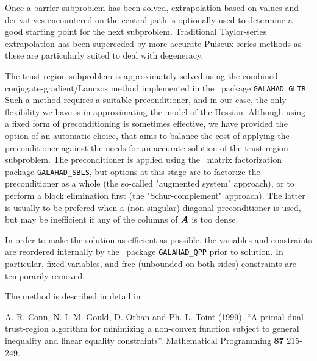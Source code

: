 \documentclass{galahad}
\begin{document}
Once a barrier subproblem has been solved, extrapolation 
based on values and derivatives encountered on the central path 
is optionally used to determine a good starting point for the next subproblem.
Traditional Taylor-series extrapolation has been superceded by more accurate
Puiseux-series methods as these are particularly suited to deal with 
degeneracy.

The trust-region subproblem is approximately solved using the 
combined conjugate-gradient/Lanczos method implemented in the 
\galahad\ package {\tt GALAHAD\_GLTR}. 
Such a method requires a suitable preconditioner,
and in our case, the only flexibility we have is in approximating the
model of the Hessian. Although using a fixed form of preconditioning is
sometimes effective, we have provided the option of an automatic choice,
that aims to balance the cost of applying the preconditioner against
the needs for an accurate solution of the trust-region subproblem. 
The preconditioner is applied using the \galahad\ matrix factorization package 
{\tt GALAHAD\_SBLS}, but options at this stage are
to factorize the preconditioner as a whole (the so-called "augmented system"
approach), or to perform a block elimination first (the "Schur-complement"
approach). The latter is usually to be prefered when a (non-singular) diagonal 
preconditioner is used, but may be inefficient if any of the columns
of ${\bm{A}}$ is too dense.

In order to make the solution as efficient as possible, the 
variables and constraints are reordered internally
by the \galahad\ package {\tt GALAHAD\_QPP} prior to solution. 
In particular, fixed variables, and 
free (unbounded on both sides) constraints are temporarily removed.
\vspace*{1mm}

\galreferences
\vspace*{1mm}

\noindent
The method is described in detail in
\vspace*{1mm}

\noindent
A. R. Conn, N. I. M. Gould, D. Orban and Ph. L. Toint (1999).
``A primal-dual trust-region algorithm for minimizing a non-convex 
function subject to general inequality and linear equality constraints''.
Mathematical Programming {\bf 87} 215-249.

\end{document}
